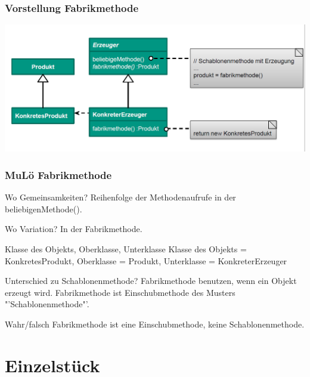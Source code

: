 \documentclass[18pt]{beamer}
\begin{document}
	\begin{frame}
		\frametitle{Vorstellung Fabrikmethode}
		\includegraphics[scale=0.4]{./pics/tut4/fab.png}
	\end{frame}

	\begin{frame}
		\frametitle{MuLö Fabrikmethode}
		\begin{block}{Wo Gemeinsamkeiten?}
			Reihenfolge der Methodenaufrufe in der beliebigenMethode().
		\end{block}
		\begin{block}{Wo Variation?}
			In der Fabrikmethode.
		\end{block}
		\begin{block}{Klasse des Objekts, Oberklasse, Unterklasse}
			Klasse des Objekts = KonkretesProdukt, Oberklasse = Produkt, Unterklasse = KonkreterErzeuger
		\end{block}
		\begin{block}{Unterschied zu Schablonenmethode?}
			Fabrikmethode benutzen, wenn ein Objekt erzeugt wird. Fabrikmethode ist Einschubmethode des Musters "'Schablonenmethode"'.
		\end{block}
		\begin{block}{Wahr/falsch}
			Fabrikmethode ist eine Einschubmethode, keine Schablonenmethode.
		\end{block}
	\end{frame}

	\section{Einzelstück}
\end{document}
